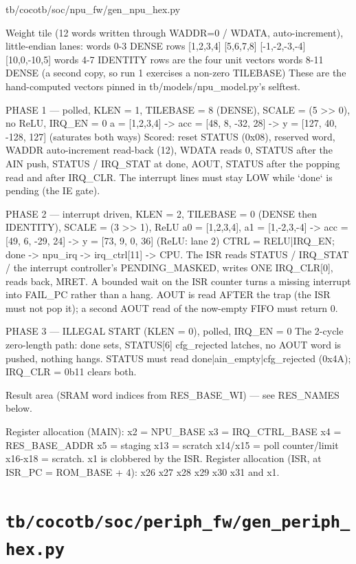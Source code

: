 \begin{relocated}{tb/cocotb/soc/npu_fw/gen_npu_hex.py}
\begin{textblock}
Weight tile (12 words written through WADDR=0 / WDATA, auto-increment), little-endian lanes:
words 0-3   DENSE    rows [1,2,3,4] [5,6,7,8] [-1,-2,-3,-4] [10,0,-10,5]
words 4-7   IDENTITY rows are the four unit vectors
words 8-11  DENSE    (a second copy, so run 1 exercises a non-zero TILEBASE)
These are the hand-computed vectors pinned in tb/models/npu_model.py's selftest.

PHASE 1 — polled, KLEN = 1, TILEBASE = 8 (DENSE), SCALE = (5 >> 0), no ReLU, IRQ_EN = 0
a = [1,2,3,4] -> acc = [48, 8, -32, 28] -> y = [127, 40, -128, 127]   (saturates both ways)
Scored: reset STATUS (0x08), reserved word, WADDR auto-increment read-back (12), WDATA reads 0,
STATUS after the AIN push, STATUS / IRQ_STAT at done, AOUT, STATUS after the popping read and
after IRQ_CLR. The interrupt lines must stay LOW while `done` is pending (the IE gate).

PHASE 2 — interrupt driven, KLEN = 2, TILEBASE = 0 (DENSE then IDENTITY), SCALE = (3 >> 1), ReLU
a0 = [1,2,3,4], a1 = [1,-2,3,-4] -> acc = [49, 6, -29, 24] -> y = [73, 9, 0, 36] (ReLU: lane 2)
CTRL = RELU|IRQ_EN; done -> npu_irq -> irq_ctrl[11] -> CPU. The ISR reads STATUS / IRQ_STAT / the
interrupt controller's PENDING_MASKED, writes ONE IRQ_CLR[0], reads back, MRET. A bounded wait on
the ISR counter turns a missing interrupt into FAIL_PC rather than a hang. AOUT is read AFTER the
trap (the ISR must not pop it); a second AOUT read of the now-empty FIFO must return 0.

PHASE 3 — ILLEGAL START (KLEN = 0), polled, IRQ_EN = 0
The 2-cycle zero-length path: done sets, STATUS[6] cfg_rejected latches, no AOUT word is pushed,
nothing hangs. STATUS must read done|ain_empty|cfg_rejected (0x4A); IRQ_CLR = 0b11 clears both.

Result area (SRAM word indices from RES_BASE_WI) — see RES_NAMES below.

Register allocation (MAIN): x2 = NPU_BASE  x3 = IRQ_CTRL_BASE  x4 = RES_BASE_ADDR  x5 = staging
x13 = scratch  x14/x15 = poll counter/limit  x16-x18 = scratch.  x1 is clobbered by the ISR.
Register allocation (ISR, at ISR_PC = ROM_BASE + 4): x26 x27 x28 x29 x30 x31 and x1.
\end{textblock}

\end{relocated}

\section{\texttt{tb/cocotb/soc/periph\_fw/gen\_periph\_hex.py}}\label{tm:suite:soc-periph-fw-gen-periph-hex}


